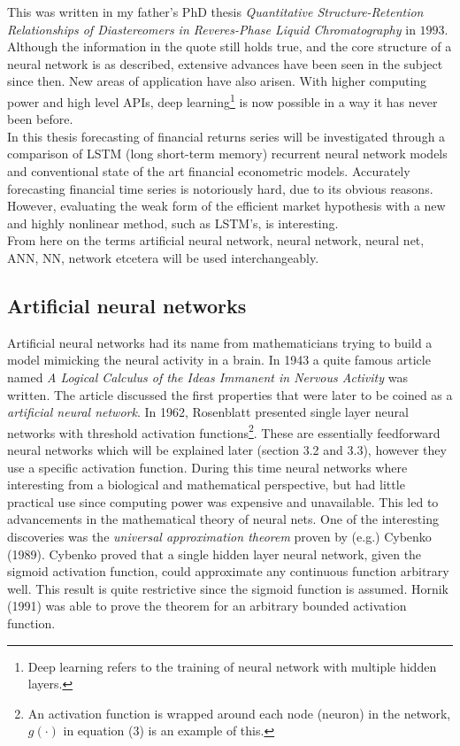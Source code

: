 \documentclass[12pt, letterpaper]{amsart}%
\begin{document}
This was written in my father's PhD thesis \textit{Quantitative Structure-Retention Relationships of Diastereomers in Reveres-Phase Liquid Chromatography} in $1993$. Although the information in the quote still holds true, and the core structure of a neural network is as described, extensive advances have been seen in the subject since then. New areas of application have also arisen. With higher computing power and high level APIs, deep learning\footnote{Deep learning refers to the training of neural network with multiple hidden layers.} is now possible in a way it has never been before.
\\

In this thesis forecasting of financial returns series will be investigated through a comparison of LSTM (long short-term memory) recurrent neural network models and conventional state of the art financial econometric models. Accurately forecasting financial time series is notoriously hard, due to its obvious reasons. However, evaluating the weak form of the efficient market hypothesis with a new and highly nonlinear method, such as LSTM's, is interesting.
\\

From here on the terms artificial neural network, neural network, neural net, ANN, NN, network etcetera will be used interchangeably.

\subsection{Artificial neural networks}
Artificial neural networks had its name from mathematicians trying to build a model mimicking the neural activity in a brain. In 1943 a quite famous article named \textit{A Logical Calculus of the Ideas Immanent in Nervous Activity} was written. The article discussed the first properties that were later to be coined as a \textit{artificial neural network}. In 1962, Rosenblatt presented single layer neural networks with threshold activation functions\footnote{An activation function is wrapped around each node (neuron) in the network, $g(\cdot)$ in equation (3) is an example of this.}. These are essentially feedforward neural networks which will be explained later (section 3.2 and 3.3), however they use a specific activation function. During this time neural networks where interesting from a biological and mathematical perspective, but had little practical use since computing power was expensive and unavailable. This led to advancements in the mathematical theory of neural nets. One of the interesting discoveries was the \textit{universal approximation theorem} proven by (e.g.) Cybenko (1989). Cybenko proved that a single hidden layer neural network, given the sigmoid activation function, could approximate any continuous function arbitrary well. This result is quite restrictive since the sigmoid function is assumed. Hornik (1991) was able to prove the theorem for an arbitrary bounded activation function.
\\
\end{document}
